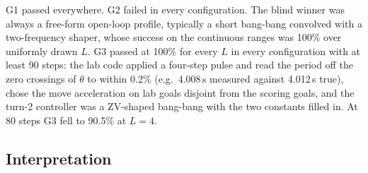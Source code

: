 \documentclass[11pt,a4paper]{article}
\begin{document}
\begin{center}\small
{}
\end{center}

G1 passed everywhere. G2 failed in every configuration. The blind winner was
always a free-form open-loop profile, typically a short bang-bang convolved
with a two-frequency shaper, whose success on the continuous ranges was 100\%
over uniformly drawn $L$. G3 passed at 100\% for every $L$ in every
configuration with at least 90 steps: the lab code applied a four-step pulse
and read the period off the zero crossings of $\theta$ to within 0.2\%
(e.g.\ 4.008\,s measured against 4.012\,s true), chose the move acceleration
on lab goals disjoint from the scoring goals, and the turn-2 controller was a
ZV-shaped bang-bang with the two constants filled in. At 80 steps G3 fell to
90.5\% at $L=4$.

\subsection*{Interpretation}
\end{document}
